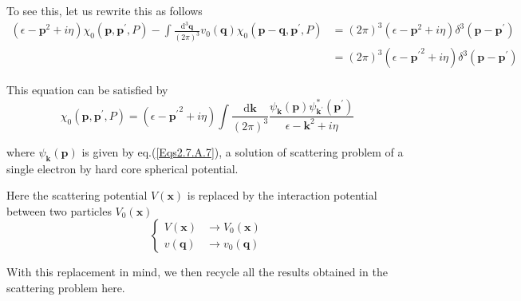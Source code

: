 To see this, let us rewrite this as follows
\begin{equation*} \label{Eqs2.7.18''} \tag{2.7.18''}
\begin{split}
(\epsilon-\mathbf{p}^2+i\eta)\chi_0(\mathbf{p},\mathbf{p}^{'},P) - \int\frac{\mathrm{d}^3\mathbf{q}}{(2\pi)^3}v_0(\mathbf{q}) \chi_0(\mathbf{p}-\mathbf{q},\mathbf{p}^{'},P)
&=(2\pi)^3 (\epsilon-\mathbf{p}^2+i\eta) \delta^3(\mathbf{p}-\mathbf{p}^{'})\\
&=(2\pi)^3 (\epsilon-{\mathbf{p}^{'}}^2+i\eta) \delta^3(\mathbf{p}-\mathbf{p}^{'})\end{split}
\end{equation*}

This equation can be satisfied by
\begin{equation} \label{Eqs2.7.20}
\chi_0(\mathbf{p},\mathbf{p}^{'},P) = (\epsilon - {\mathbf{p}^{'}}^2 + i \eta) \int \frac{\mathrm{d}\mathbf{k}}{(2\pi)^3} \frac{\psi_{\mathbf{k}}(\mathbf{p})\psi_{\mathbf{k}^{'}}^{*} (\mathbf{p}^{'})}{\epsilon - \mathbf{k}^2 + i \eta}
\end{equation}

where $\psi_{\mathbf{k}}(\mathbf{p})$ is given by eq.(\ref{Eqs2.7.A.7}), a solution of scattering problem of a single electron by hard core spherical potential.

Here the scattering potential $V(\mathbf{x})$ is replaced by the interaction potential between two particles $V_0(\mathbf{x})$
\begin{equation} \label{Eqs2.7.21}
\left\{ \begin{split} V(\mathbf{x}) &\rightarrow V_0(\mathbf{x})\\ v(\mathbf{q}) &\rightarrow v_0(\mathbf{q})
\end{split} \right.
\end{equation}

With this replacement in mind, we then recycle all the results obtained in the scattering problem here.

